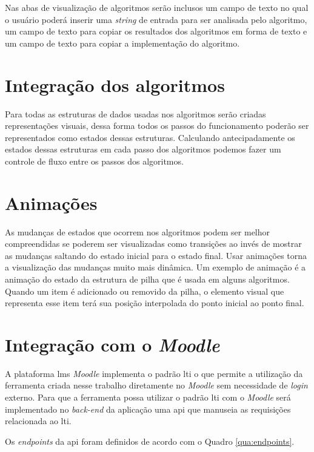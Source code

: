 Nas abas de visualização de algoritmos serão inclusos um campo de texto no qual o usuário poderá inserir uma \textit{string} de entrada para ser analisada pelo algoritmo, um campo de texto para copiar os resultados dos algoritmos em forma de texto e um campo de texto para copiar a implementação do algoritmo.

\section{Integração dos algoritmos}
Para todas as estruturas de dados usadas nos algoritmos serão criadas representações visuais, dessa forma todos os passos do funcionamento poderão ser representados como estados dessas estruturas. Calculando antecipadamente os estados dessas estruturas em cada passo dos algoritmos podemos fazer um controle de fluxo entre os passos dos algoritmos.

\section{Animações}
As mudanças de estados que ocorrem nos algoritmos podem ser melhor compreendidas se poderem ser visualizadas como transições ao invés de mostrar as mudanças saltando do estado inicial para o estado final. Usar animações torna a visualização das mudanças muito mais dinâmica. Um exemplo de animação é a animação do estado da estrutura de pilha que é usada em alguns algoritmos. Quando um item é adicionado ou removido da pilha, o elemento visual que representa esse item terá sua posição interpolada do ponto inicial ao ponto final.

\section{Integração com o \textit{Moodle}}
A plataforma \gls{lms} \textit{Moodle} implementa o padrão \gls{lti} o que permite a utilização da ferramenta criada nesse trabalho diretamente no \textit{Moodle} sem necessidade de \textit{login} externo. Para que a ferramenta possa utilizar o padrão \gls{lti} com o \textit{Moodle} será implementado no \textit{back-end} da aplicação uma \gls{api} que manuseia as requisições relacionada ao \gls{lti}. 

Os \textit{endpoints} da \gls{api} foram definidos de acordo com o Quadro \ref{qua:endpoints}.

